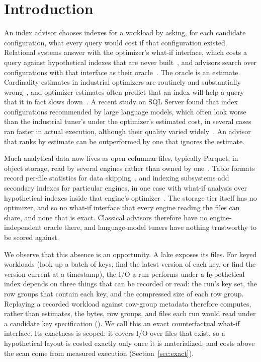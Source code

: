 \section{Introduction}\label{sec:intro}

An index advisor chooses indexes for a workload by asking, for each candidate
configuration, what every query would cost if that configuration existed.
Relational systems answer with the optimizer's what-if interface, which costs a
query against hypothetical indexes that are never built~\cite{whatif1998}, and
advisors search over configurations with that interface as their
oracle~\cite{autoadmin1997,bruno2005relax,kossmann2020}. The oracle is an
estimate. Cardinality estimates in industrial optimizers are routinely and
substantially wrong~\cite{leis2015}, and optimizer estimates often predict that
an index will help a query that it in fact slows down~\cite{aimeetsai}. A recent
study on SQL Server found that index configurations recommended by large
language models, which often look worse than the industrial tuner's under the
optimizer's estimated cost, in several cases ran faster in actual execution,
although their quality varied widely~\cite{dtallm2026}. An advisor that ranks by
estimate can be outperformed by one that ignores the estimate.

Much analytical data now lives as open columnar files, typically Parquet, in
object storage, read by several engines rather than owned by
one~\cite{lakehouse2021}. Table formats record per-file statistics for data
skipping~\cite{deltalake,icebergspec}, and indexing subsystems add secondary
indexes for particular engines, in one case with what-if analysis over
hypothetical indexes inside that engine's optimizer~\cite{hyperspace}. The
storage tier itself has no optimizer, and so no what-if interface that every
engine reading the files can share, and none that is exact. Classical advisors
therefore have no engine-independent oracle there, and language-model tuners
have nothing trustworthy to be scored against.

We observe that this absence is an opportunity. A lake exposes its files. For
keyed workloads (look up a batch of keys, find the latest version of each key,
or find the version current at a timestamp), the I/O a run performs under a
hypothetical index depends on three things that can be recorded or read: the
run's key set, the row groups that contain each key, and the compressed size of
each row group. Replaying a recorded workload against row-group metadata
therefore computes, rather than estimates, the bytes, row groups, and files each
run would read under a candidate key specification (). We call this an
exact counterfactual what-if interface. Its exactness is scoped: it covers I/O
over files that exist, so a hypothetical layout is costed exactly only once it
is materialized, and costs above the scan come from measured execution
(Section~\ref{sec:exact}).

